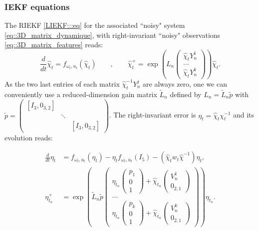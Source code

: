 \documentclass[a4paper,12pt,onecolumn]{article}
\begin{document}
\subsubsection{IEKF equations}
\label{sect::IEKF_eq_3D}
The RIEKF \eqref{LIEKF:::eq} for the associated ``noisy" system
 \eqref{eq::3D_matrix_dynamique}, with right-invariant ``noisy" observations \eqref{eq::3D_matrix_features} reads:
\[
\frac{d}{dt} \hat{\chi}_t = f_{\omega_t,u_t} (\hat{\chi}_t)
\qquad , \qquad
\hat{\chi}_t^+= \exp \left( L_n \begin{pmatrix} \hat{\chi}_t Y_n^1 \\ ... \\ \hat{\chi}_t Y_n^k  \end{pmatrix} \right) \hat{\chi}_t.
\]
As the two last entries of each matrix $\hat{\chi}_t^{-1}Y_n^j$ are always zero, one we can conveniently use a reduced-dimension gain matrix $\tilde{L}_n$ defined by $L_n=\tilde{L}_n \tilde{p}$ with $\tilde{p}=\begin{pmatrix} [I_3, 0_{3,2}] & & \\ & \ddots \\ & & [I_3, 0_{3,2}] \end{pmatrix}$.  
The right-invariant error is $
\eta_t =  \hat{\chi}_t \chi_t^{-1}
$
and its evolution reads:

\begin{align}
 \frac{d}{dt} \eta_t & = f_{\omega_t,u_t} (\eta_t) - \eta_t f_{\omega_t,u_t}(I_5) - (\hat{\chi}_t  w_t \hat{\chi}^{-1}) \eta_t , \label{eq::error_3D_dynamics_features} \\
\eta_{t_n}^+ & =  \exp \left( \tilde{L}_n \tilde{p} \begin{pmatrix} \eta_{t_n} \begin{pmatrix} p_1 \\ 0 \\ 1 \end{pmatrix} +\hat{\chi}_{t_n} \begin{pmatrix} V_n^1 \\ 0_{2,1} \end{pmatrix}  \\ ... \\  \eta_{t_n} \begin{pmatrix} p_k \\ 0 \\ 1 \end{pmatrix} + \hat{\chi}_{t_n} \begin{pmatrix} V_n^k \\ 0_{2,1} \end{pmatrix}  \end{pmatrix} \right) \eta_{t_n}. \label{eq::error_3D_observation_features}
\end{align}
\end{document}
